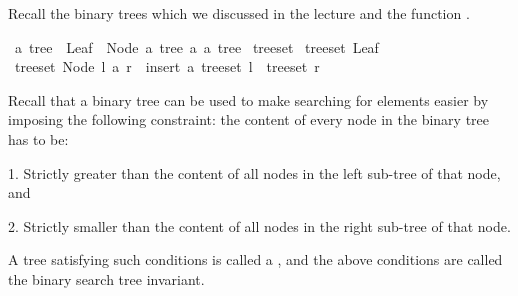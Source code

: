 %
\begin{isabellebody}%
%
%
\isadelimtheory
%
\endisadelimtheory
%
\isatagtheory
%
\endisatagtheory
{\isafoldtheory}%
%
\isadelimtheory
%
\endisadelimtheory
%
\begin{isamarkuptext}%
%
\end{isamarkuptext}\isamarkuptrue%
%
\begin{isamarkuptext}%
Recall the binary trees which we discussed in the lecture and the function .%
\end{isamarkuptext}\isamarkuptrue%
\isamarkupfalse%
\ {\isacharprime}{\kern0pt}a\ tree\ {\isacharequal}{\kern0pt}\ Leaf\ {\isacharbar}{\kern0pt}\ Node\ {\isachardoublequoteopen}{\isacharprime}{\kern0pt}a\ tree{\isachardoublequoteclose}\ {\isacharprime}{\kern0pt}a\ {\isachardoublequoteopen}{\isacharprime}{\kern0pt}a\ tree{\isachardoublequoteclose}\isanewline
\isanewline
{}\isamarkupfalse%
\ tree{\isacharunderscore}{\kern0pt}set\ \isanewline
{\isachardoublequoteopen}tree{\isacharunderscore}{\kern0pt}set\ Leaf\ {\isacharequal}{\kern0pt}\ {\isacharbraceleft}{\kern0pt}{\isacharbraceright}{\kern0pt}{\isachardoublequoteclose}\isanewline
{\isacharbar}{\kern0pt}\ {\isachardoublequoteopen}tree{\isacharunderscore}{\kern0pt}set\ {\isacharparenleft}{\kern0pt}Node\ l\ a\ r{\isacharparenright}{\kern0pt}\ {\isacharequal}{\kern0pt}\ insert\ a\ {\isacharparenleft}{\kern0pt}tree{\isacharunderscore}{\kern0pt}set\ l{\isacharparenright}{\kern0pt}\ {\isasymunion}\ {\isacharparenleft}{\kern0pt}tree{\isacharunderscore}{\kern0pt}set\ r{\isacharparenright}{\kern0pt}{\isachardoublequoteclose}%
\begin{isamarkuptext}%
%
\end{isamarkuptext}\isamarkuptrue%
%
\begin{isamarkuptext}%
Recall that a binary tree can be used to make searching for elements easier by imposing the
    following constraint: the content  of every node  in the binary tree has to be:

     1. Strictly greater than the content of all nodes in the left sub-tree  of that node, and

     2. Strictly smaller than the content of all nodes in the right sub-tree  of that node.

    A tree satisfying such conditions is called a , and the above conditions
    are called the binary search tree invariant.


\end{isamarkuptext}
\end{isabellebody}

